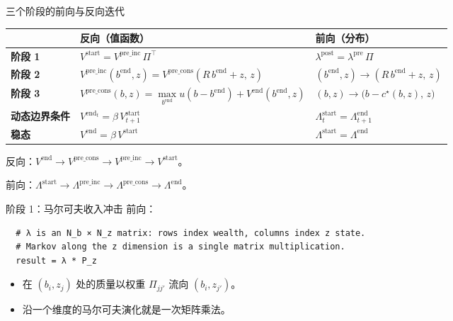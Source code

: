 \documentclass[10pt,aspectratio=169]{beamer}
\begin{document}
\begin{frame}{三个阶段的前向与反向迭代}
  \footnotesize
  \setlength{\tabcolsep}{6pt}
  \renewcommand{\arraystretch}{1.45}
  \begin{tabular}{@{}l l l@{}}
  \toprule
  & \textbf{反向}（值函数） & \textbf{前向}（分布） \\
  \midrule
  \textbf{阶段 1}    & $V^{\mathrm{start}} = V^{\mathrm{pre\_inc}}\, \Pi^\top$
                      & $\lambda^{\mathrm{post}} = \lambda^{\mathrm{pre}}\, \Pi$ \\
  \textbf{阶段 2}    & $V^{\mathrm{pre\_inc}}(b^{\mathrm{end}}, z) = V^\text{pre\_cons}(R\, b^{\mathrm{end}} + z,\, z)$
                      & $(b^{\mathrm{end}}, z) \to (R\, b^{\mathrm{end}} + z,\, z)$ \\
  \textbf{阶段 3}    & $V^\text{pre\_cons}(b, z) = \max\limits_{b^{\mathrm{end}}} u(b - b^{\mathrm{end}}) + V^{\mathrm{end}}(b^{\mathrm{end}}, z)$
                      & $(b, z) \to \big(b - c^\star(b, z),\, z\big)$ \\
  \midrule
  \textbf{动态边界条件}   & $V^{\mathrm{end}_t} = \beta\, V^{\mathrm{start}}_{t+1}$
                      & $\Lambda^\text{start}_t = \Lambda^\text{end}_{t+1}$ \\
  \textbf{稳态}   & $V^{\mathrm{end}} = \beta\, V^{\mathrm{start}}$
                      & $\Lambda^\text{start} = \Lambda^\text{end}$ \\
  \bottomrule
  \end{tabular}

  \vspace{0.8em}

  \footnotesize
  反向：$V^{\mathrm{end}} \to V^\text{pre\_cons} \to V^{\mathrm{pre\_inc}} \to V^{\mathrm{start}}$。

  前向：$\Lambda^\text{start} \to \Lambda^\text{pre\_inc} \to \Lambda^\text{pre\_cons} \to \Lambda^\text{end}$。
\end{frame}

\begin{frame}[fragile]{阶段 1：马尔可夫收入冲击}
  前向：
  \begin{lstlisting}
  # λ is an N_b × N_z matrix: rows index wealth, columns index z state.
  # Markov along the z dimension is a single matrix multiplication.
  result = λ * P_z
  \end{lstlisting}

  \begin{itemize}
    \item 在 $(b_i, z_j)$ 处的质量以权重 $\Pi_{j j'}$ 流向 $(b_i, z_{j'})$。
    \item 沿一个维度的马尔可夫演化就是一次矩阵乘法。
  \end{itemize}
\end{frame}
\end{document}
